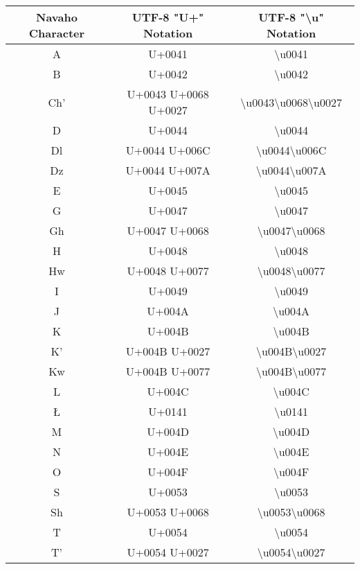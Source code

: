 \begin{longtable}{|c|c|c|}
\hline
\textbf{Navaho Character} & \textbf{UTF-8 "U+" Notation} & \textbf{UTF-8 "\textbackslash{u}" Notation} \\
\hline
A & U+0041 & \textbackslash{}u0041 \\ \hline
B & U+0042 & \textbackslash{}u0042 \\ \hline
Ch' & U+0043 U+0068 U+0027 & \textbackslash{}u0043\textbackslash{}u0068\textbackslash{}u0027 \\ \hline
D & U+0044 & \textbackslash{}u0044 \\ \hline
Dl & U+0044 U+006C & \textbackslash{}u0044\textbackslash{}u006C \\ \hline
Dz & U+0044 U+007A & \textbackslash{}u0044\textbackslash{}u007A \\ \hline
E & U+0045 & \textbackslash{}u0045 \\ \hline
G & U+0047 & \textbackslash{}u0047 \\ \hline
Gh & U+0047 U+0068 & \textbackslash{}u0047\textbackslash{}u0068 \\ \hline
H & U+0048 & \textbackslash{}u0048 \\ \hline
Hw & U+0048 U+0077 & \textbackslash{}u0048\textbackslash{}u0077 \\ \hline
I & U+0049 & \textbackslash{}u0049 \\ \hline
J & U+004A & \textbackslash{}u004A \\ \hline
K & U+004B & \textbackslash{}u004B \\ \hline
K' & U+004B U+0027 & \textbackslash{}u004B\textbackslash{}u0027 \\ \hline
Kw & U+004B U+0077 & \textbackslash{}u004B\textbackslash{}u0077 \\ \hline
L & U+004C & \textbackslash{}u004C \\ \hline
Ł & U+0141 & \textbackslash{}u0141 \\ \hline
M & U+004D & \textbackslash{}u004D \\ \hline
N & U+004E & \textbackslash{}u004E \\ \hline
O & U+004F & \textbackslash{}u004F \\ \hline
S & U+0053 & \textbackslash{}u0053 \\ \hline
Sh & U+0053 U+0068 & \textbackslash{}u0053\textbackslash{}u0068 \\ \hline
T & U+0054 & \textbackslash{}u0054 \\ \hline
T' & U+0054 U+0027 & \textbackslash{}u0054\textbackslash{}u0027 \\ \hline

\end{longtable}
